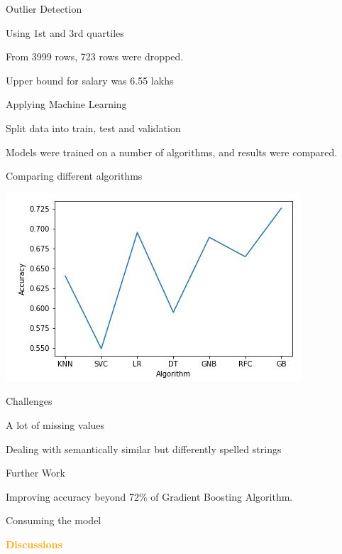 \documentclass[14pt]{beamer}
\begin{document}
\begin{frame}{Outlier Detection}
\pause
\renewcommand{\labelitemi}{$\square$}
 \begin{fullpageitemize}
  \item Using 1st and 3rd quartiles
  \item From 3999 rows, 723 rows were dropped.
  \item Upper bound for salary was 6.55 lakhs
 \end{fullpageitemize}
\end{frame}
\begin{frame}{Applying Machine Learning}
\pause
\renewcommand{\labelitemi}{$\square$}
 \begin{fullpageitemize}
  \item Split data into train, test and validation
  \item Models were trained on a number of algorithms, and results were compared.
 \end{fullpageitemize}
\end{frame}
\begin{frame}{Comparing different algorithms}
\pause
 \begin{fullpageitemize}
 \includegraphics{algorithmComparison.JPG}
 \end{fullpageitemize}
\end{frame}
\begin{frame}{Challenges}
\pause
\renewcommand{\labelitemi}{$\square$}
 \begin{fullpageitemize}
  \item A lot of missing values 
  \item Dealing with semantically similar but differently spelled strings 
 \end{fullpageitemize}
 \end{frame}
 \begin{frame}{Further Work}
\pause
\renewcommand{\labelitemi}{$\square$}
 \begin{fullpageitemize}

   \item Improving accuracy beyond 72\% of Gradient Boosting Algorithm.
  \item Consuming the model

 \end{fullpageitemize}
 \end{frame}
 \begin{frame}{}
 \centering
            \Huge\bfseries
        \textcolor{orange}{Discussions}
\end{frame}
\end{document}
